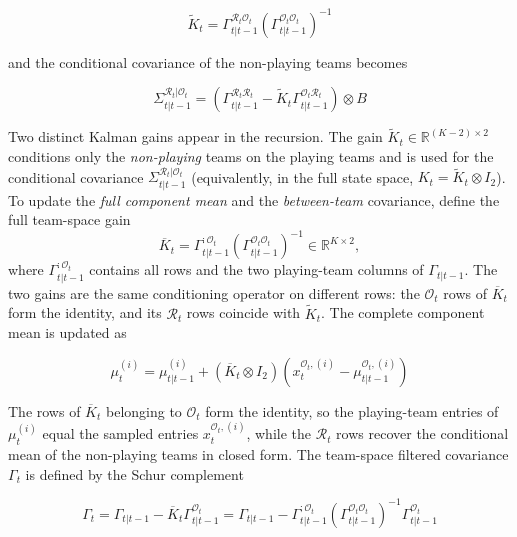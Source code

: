 \begin{equation*}
    \tilde{K}_t = \Gamma^{\mathcal{R}_t\mathcal{O}_t}_{t|t-1} (\Gamma^{\mathcal{O}_t\mathcal{O}_t}_{t|t-1})^{-1}
\end{equation*}

and the conditional covariance of the non-playing teams becomes

\begin{equation*}
    \Sigma_{t|t-1}^{\mathcal{R}_t|\mathcal{O}_t} = \left( \Gamma^{\mathcal{R}_t\mathcal{R}_t}_{t|t-1} - \tilde{K}_t \Gamma^{\mathcal{O}_t\mathcal{R}_t}_{t|t-1} \right) \otimes B
\end{equation*}

Two distinct Kalman gains appear in the recursion. The gain $\tilde{K}_t \in \mathbb{R}^{(K-2) \times 2}$ conditions only the \emph{non-playing} teams on the playing teams and is used for the conditional covariance $\Sigma_{t|t-1}^{\mathcal{R}_t|\mathcal{O}_t}$ (equivalently, in the full state space, $K_t = \tilde{K}_t \otimes I_2$). To update the \emph{full component mean} and the \emph{between-team} covariance, define the full team-space gain
\begin{equation*}
    \overline{K}_t = \Gamma_{t|t-1}^{:\mathcal{O}_t} \left( \Gamma_{t|t-1}^{\mathcal{O}_t\mathcal{O}_t} \right)^{-1} \in \mathbb{R}^{K \times 2},
\end{equation*}
where $\Gamma_{t|t-1}^{:\mathcal{O}_t}$ contains all rows and the two playing-team columns of $\Gamma_{t|t-1}$. The two gains are the same conditioning operator on different rows: the $\mathcal{O}_t$ rows of $\overline{K}_t$ form the identity, and its $\mathcal{R}_t$ rows coincide with $\tilde{K}_t$. The complete component mean is updated as

\begin{equation*}
    \mu_t^{(i)} = \mu_{t|t-1}^{(i)} + (\overline{K}_t \otimes I_2) \left( x_t^{\mathcal{O}_t,(i)} - \mu_{t|t-1}^{\mathcal{O}_t,(i)} \right)
\end{equation*}

The rows of $\overline{K}_t$ belonging to $\mathcal{O}_t$ form the identity, so the playing-team entries of $\mu_t^{(i)}$ equal the sampled entries $x_t^{\mathcal{O}_t,(i)}$, while the $\mathcal{R}_t$ rows recover the conditional mean of the non-playing teams in closed form. The team-space filtered covariance $\Gamma_t$ is defined by the Schur complement

\begin{equation*}
    \Gamma_t = \Gamma_{t|t-1} - \overline{K}_t \Gamma_{t|t-1}^{\mathcal{O}_t} = \Gamma_{t|t-1} - \Gamma_{t|t-1}^{:\mathcal{O}_t} \left( \Gamma_{t|t-1}^{\mathcal{O}_t\mathcal{O}_t} \right)^{-1} \Gamma_{t|t-1}^{\mathcal{O}_t}
\end{equation*}

